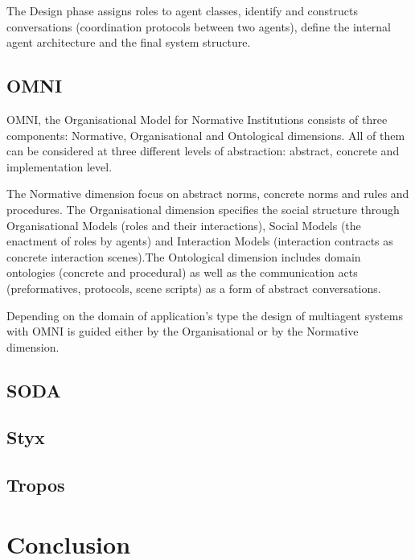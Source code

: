 \documentclass{article}
\begin{document}
The Design phase assigns roles to agent classes, identify and constructs conversations (coordination protocols between two agents), define the internal agent architecture and the final system structure. 

\subsection{OMNI}

OMNI, the Organisational Model for Normative Institutions \cite{journals/aamas/Vazquez-SalcedaDD05} consists of three components: Normative, Organisational and Ontological dimensions. All of them can be considered at three different levels of abstraction: abstract, concrete and implementation level.

The Normative dimension focus on abstract norms, concrete norms and rules and procedures. The Organisational dimension specifies the social structure through Organisational Models (roles and their interactions), Social Models (the enactment of roles by agents) and Interaction Models (interaction contracts as concrete interaction scenes).The Ontological dimension includes domain ontologies (concrete and procedural) as well as the communication acts (preformatives, protocols, scene scripts) as a form of abstract conversations.

Depending on the domain of application's type the design of multiagent systems with OMNI is guided either by the Organisational or by the Normative dimension.

\subsection{SODA}

\cite{conf/aose/Omicini00}

\subsection{Styx}

\cite{bush2001styx}

\subsection{Tropos}

\cite{journals/informaticaSI/SusiPMG05}

\section{Conclusion}



\end{document}

